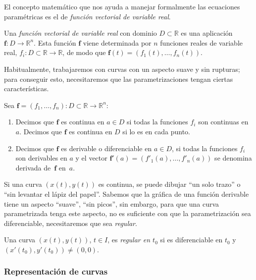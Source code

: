 El concepto matemático que nos ayuda a manejar formalmente las ecuaciones paramétricas es el de \emph{función vectorial de variable real}.
%
\begin{definicion}
Una \emph{función vectorial de variable real} con dominio $\mathit{D}\subset \mathbb{R}$ es una
aplicación $\boldsymbol{f} \colon \mathit{D}\to \mathbb{R}^n$. Esta función $\boldsymbol{f}$ viene determinada por $n$ funciones reales de variable real, $f_i\colon
\mathit{D}\subset\mathbb{R} \to\mathbb{R}$, de modo que $\boldsymbol{f}(t)=(f_1(t),\dots ,f_n(t))$.
\end{definicion}

Habitualmente, trabajaremos con curvas con un aspecto suave y sin rupturas; para conseguir esto, necesitaremos que las parametrizaciones tengan ciertas características.

\begin{definicion} Sea $\boldsymbol{f}=(f_1,\dots ,f_n) \colon \mathit{D}\subset \mathbb{R}\to
\mathbb{R}^n$:
\begin{enumerate}
\item Decimos que $\boldsymbol{f}$ es continua en $a\in \mathit{D}$ si todas la funciones $f_i$ son continuas en $a$. Decimos que $\boldsymbol{f}$ es continua en $\mathit{D}$ si lo es en cada punto.
\item Decimos que $\boldsymbol{f}$ es derivable o diferenciable en $a\in \mathit{D}$, si todas la funciones $f_i$ son derivables en $a$ y el vector $\boldsymbol{f}'(a)=(f'_1(a),\dots,f'_n(a))$ se denomina derivada de~$\boldsymbol{f}$ en~$a$.
\end{enumerate}
\end{definicion}

Si una curva $(x(t),y(t))$ es continua, se puede dibujar ``un solo trazo'' o ``sin levantar el lápiz del papel''.
Sabemos que la gráfica de una función derivable tiene un aspecto ``suave'', ``sin picos'', sin embargo, para que una curva parametrizada tenga este aspecto, no es suficiente con que la parametrización sea diferenciable, necesitaremos que sea \emph{regular}.

\begin{definicion}
Una curva $(x(t),y(t))$, $t\in I$, es \emph{regular en $t_0$} si es diferenciable en $t_0$ y $(x'(t_0),y'(t_0))\ne(0,0)$. 
\end{definicion}

\subsubsection{Representación de curvas}

